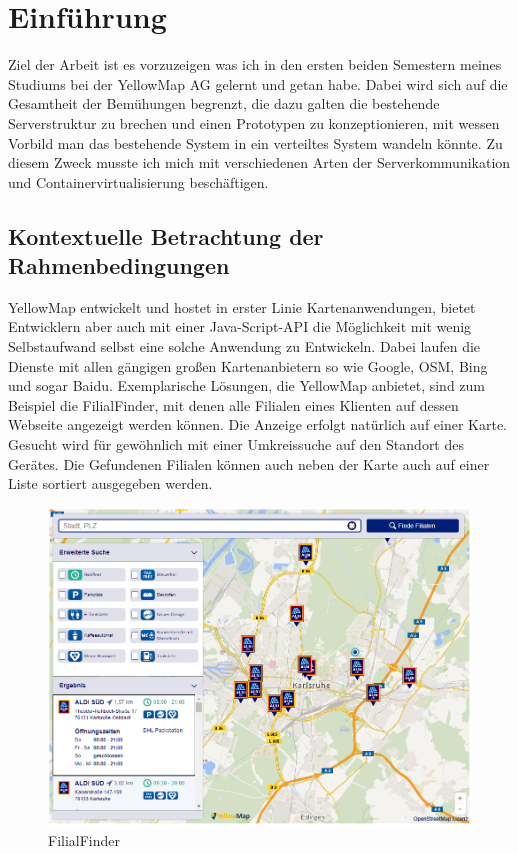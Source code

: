 \documentclass[12pt,a4paper]{scrartcl}
\begin{document}
\section{Einf\"uhrung}
Ziel der Arbeit ist es vorzuzeigen was ich in den ersten beiden Semestern meines Studiums bei der YellowMap AG gelernt und getan habe. Dabei wird sich auf die Gesamtheit der Bemühungen begrenzt, die dazu galten die bestehende Serverstruktur zu brechen und einen Prototypen zu konzeptionieren, mit wessen Vorbild man das bestehende System in ein verteiltes System wandeln könnte. Zu diesem Zweck musste ich mich mit verschiedenen Arten der Serverkommunikation und Containervirtualisierung beschäftigen.

\subsection{Kontextuelle Betrachtung der Rahmenbedingungen}

YellowMap entwickelt und hostet in erster Linie Kartenanwendungen, bietet Entwicklern aber auch mit einer Java-Script-API die Möglichkeit mit wenig Selbstaufwand selbst eine solche Anwendung zu Entwickeln. Dabei laufen die Dienste mit allen gängigen großen Kartenanbietern so wie Google, OSM, Bing und sogar Baidu. Exemplarische Lösungen, die YellowMap anbietet, sind zum Beispiel die FilialFinder, mit denen alle Filialen eines Klienten auf dessen Webseite angezeigt werden können. Die Anzeige erfolgt natürlich auf einer Karte. Gesucht wird für gewöhnlich mit einer Umkreissuche auf den Standort des Gerätes. Die Gefundenen Filialen können auch neben der Karte auch auf einer Liste sortiert ausgegeben werden.

\begin{figure}[h!]
	\centering
	\includegraphics[scale=0.55]{YmFF.png}
	\caption[https://www.aldi-sued.de/filialen/]{FilialFinder}
\end{figure}
\end{document}
